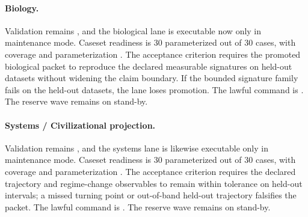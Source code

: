 \paragraph{Biology.}
Validation remains , and the biological lane is executable now
only in maintenance mode. Caseset readiness is 30 parameterized out of 30
cases, with coverage  and parameterization
. The acceptance criterion requires
the promoted biological packet to reproduce the declared measurable signatures
on held-out datasets without widening the claim boundary. If the bounded
signature family fails on the held-out datasets, the lane loses promotion. The
lawful command is
. The reserve wave
 remains on stand-by.

\paragraph{Systems / Civilizational projection.}
Validation remains , and the systems lane is likewise executable
only in maintenance mode. Caseset readiness is 30 parameterized out of 30
cases, with coverage  and parameterization
. The acceptance criterion requires
the declared trajectory and regime-change observables to remain within
tolerance on held-out intervals; a missed turning point or out-of-band held-out
trajectory falsifies the packet. The lawful command is
. The reserve wave
 remains on stand-by.

\endgroup
